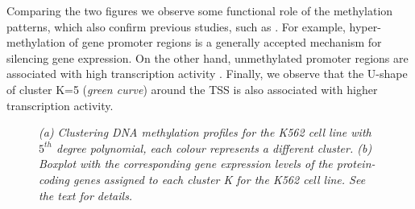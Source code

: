 Comparing the two figures we observe some functional role of the methylation patterns, which also confirm previous studies, such as \citet{Vanderkraats2013}. For example, hyper-methylation of gene promoter regions is a generally accepted mechanism for silencing gene expression. On the other hand, unmethylated promoter regions are associated with high transcription activity \citep{Deaton2011}. Finally, we observe that the U-shape of cluster K=5 (\emph{green curve}) around the TSS is also associated with higher transcription activity.
\begin{figure}[ht!]
     \begin{center}
    \end{center}
    \caption{\emph{(a) Clustering DNA methylation profiles for the K562 cell line with $5^{th}$ degree polynomial, each colour represents a different cluster. (b) Boxplot with the corresponding gene expression levels of the protein-coding genes assigned to each cluster K for the K562 cell line. See the text for details.}}
   \label{meth-k562-pic}
\end{figure}
